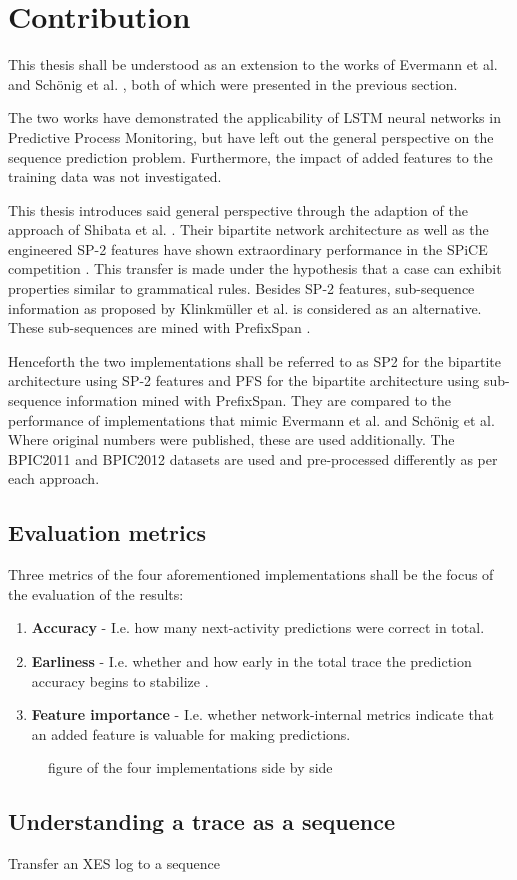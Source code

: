 \chapter{Contribution}\label{sec:contribution}
This thesis shall be understood as an extension to the works of Evermann et al. \cite{evermann2016} and Schönig et al. \cite{schoenig2018}, both of which were presented in the previous section.

The two works have demonstrated the applicability of LSTM neural networks in Predictive Process Monitoring, but have left out the general perspective on the sequence prediction problem. Furthermore, the impact of added features to the training data was not investigated.

This thesis introduces said general perspective through the adaption of the approach of Shibata et al. \cite{shibata2016bipartite}. Their bipartite network architecture as well as the engineered SP-2 features have shown extraordinary performance in the SPiCE competition \cite{web:spice}. This transfer is made under the hypothesis that a case can exhibit properties similar to grammatical rules. Besides SP-2 features, sub-sequence information as proposed by Klinkmüller et al. \cite{klinkmuller2018reliablemonitoring} is considered as an alternative. These sub-sequences are mined with PrefixSpan \cite{pei2001prefixspan}.
\newline

Henceforth the two implementations shall be referred to as SP2 for the bipartite architecture using SP-2 features and PFS for the bipartite architecture using sub-sequence information mined with PrefixSpan. They are compared to the performance of implementations that mimic Evermann et al. and Schönig et al. Where original numbers were published, these are used additionally. The BPIC2011 \cite{BPIC2011} and BPIC2012 \cite{BPIC2012} datasets are used and pre-processed differently as per each approach.\\

\section{Evaluation metrics}
Three metrics of the four aforementioned implementations shall be the focus of the evaluation of the results:
\begin{enumerate}
    \item\textbf{Accuracy} - I.e. how many next-activity predictions were correct in total.
    \item\textbf{Earliness} - I.e. whether and how early in the total trace the prediction accuracy begins to stabilize \cite{francescomarino2015}.
    \item\textbf{Feature importance} - I.e. whether network-internal metrics indicate that an added feature is valuable for making predictions.
\end{enumerate}

\begin{figure}
    \centering
    \caption{figure of the four implementations side by side}
    \label{fig:my_label}
\end{figure}

\section{Understanding a trace as a sequence}
Transfer an XES log to a sequence